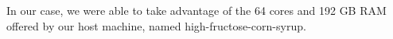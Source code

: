In our case, we were able to take advantage of the 64 cores and 192 GB RAM offered by our host
machine, named high-fructose-corn-syrup.

